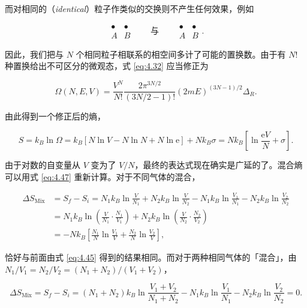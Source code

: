 而对相同的（\textit{identical}）粒子作类似的交换则不产生任何效果，例如

\begin{equation*}
  \begin{array}{c|c}
    \bullet & \bullet\\ \hline
    A & B
  \end{array}
  \qquad\text{与}\qquad
  \begin{array}{c|c}
    \bullet & \bullet\\ \hline
    A & B
  \end{array}.
\end{equation*}

因此，我们把与 $N$ 个相同粒子相联系的相空间多计了可能的置换数。由于有 $N!$ 种置换给出不可区分的微观态，式 \eqref{eq:4.32} 应当修正为

\begin{equation}\label{eq:4.46}
  \Omega(N,E,V)=\frac{V^N}{N!}\frac{2\pi^{3N/2}}{(3N/2-1)!}(2mE)^{(3N-1)/2}\Delta_R.
\end{equation}

由此得到一个修正后的熵，

\begin{equation}\label{eq:4.47}
  S=k_B\ln\Omega=k_B\left[N\ln V-N\ln N+N\ln \mathrm{e}\right]+Nk_B\sigma=Nk_B\left[\ln\frac{\mathrm{e}V}{N}+\sigma\right].
\end{equation}

由于对数的自变量从 $V$ 变为了 $V/N$，最终的表达式现在确实是广延的了。混合熵可以用式 \eqref{eq:4.47} 重新计算。对于不同气体的混合，

\begin{equation}\label{eq:4.48}
  \begin{aligned}
    \Delta S_{\text{Mix}}&=S_f-S_i=N_1k_B\ln\frac{V}{N_1}+N_2k_B\ln\frac{V}{N_2}-N_1k_B\ln\frac{V_1}{N_1}-N_2k_B\ln\frac{V_2}{N_2}\\
    &=N_1k_B\ln\left(\frac{V}{N_1}\cdot\frac{N_1}{V_1}\right)+N_2k_B\ln\left(\frac{V}{N_2}\cdot\frac{N_2}{V_2}\right)\\
    &=-Nk_B\left[\frac{N_1}{N}\ln\frac{V_1}{V}+\frac{N_2}{N}\ln\frac{V_2}{V}\right],
  \end{aligned}
\end{equation}

恰好与前面由式 \eqref{eq:4.45} 得到的结果相同。而对于两种相同气体的「混合」，由 $N_1/V_1=N_2/V_2=(N_1+N_2)/(V_1+V_2)$，

\begin{equation}\label{eq:4.49}
  \Delta S_{\text{Mix}}=S_f-S_i=(N_1+N_2)k_B\ln\frac{V_1+V_2}{N_1+N_2}-N_1k_B\ln\frac{V_1}{N_1}-N_2k_B\ln\frac{V_2}{N_2}=0.
\end{equation}


